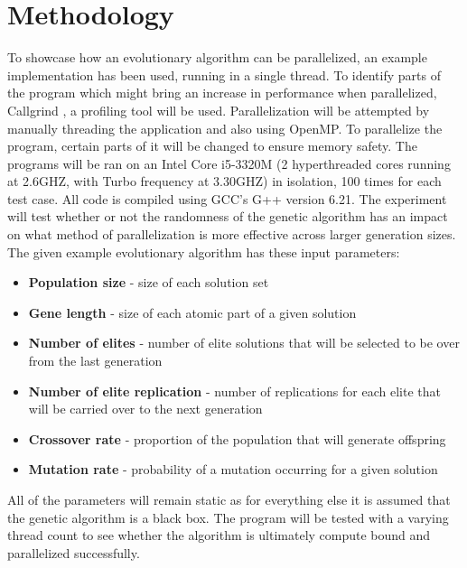 \documentclass[journal,transmag]{IEEEtran}
\begin{document}
\section{Methodology}
        To showcase how an evolutionary algorithm can be parallelized, an example implementation
        has been used, running in a single thread. To identify parts of the program which might
        bring an increase in performance when parallelized, Callgrind \cite{callgrind}, a profiling tool will be 
        used. Parallelization will be attempted by manually threading the application and also 
        using OpenMP. To parallelize the program, certain parts of it will be changed to ensure
        memory safety. The programs will be ran on an Intel Core i5-3320M (2 hyperthreaded cores
        running at 2.6GHZ, with Turbo frequency at 3.30GHZ) in isolation, 100 times
        for each test case. All code is compiled using GCC's G++ version 6.21. The experiment will
        test whether or not the randomness of the genetic algorithm has an impact on what method
        of parallelization is more effective across larger generation sizes.
        The given example evolutionary algorithm has these input parameters:
        \begin{itemize}
            \item \textbf{Population size} - size of each solution set
            \item \textbf{Gene length} - size of each atomic part of a given solution
            \item \textbf{Number of elites} - number of elite solutions that will be selected to be over from the last generation
            \item \textbf{Number of elite replication} - number of replications for each elite that will be carried over to the next generation
            \item \textbf{Crossover rate} - proportion of the population that will generate offspring
            \item \textbf{Mutation rate} - probability of a mutation occurring for a given solution
        \end{itemize}
        All of the parameters will remain static as for everything else it is assumed that the genetic 
        algorithm is a black box. The program will be tested with a varying thread count to 
        see whether the algorithm is ultimately compute bound and parallelized successfully.
\end{document}
